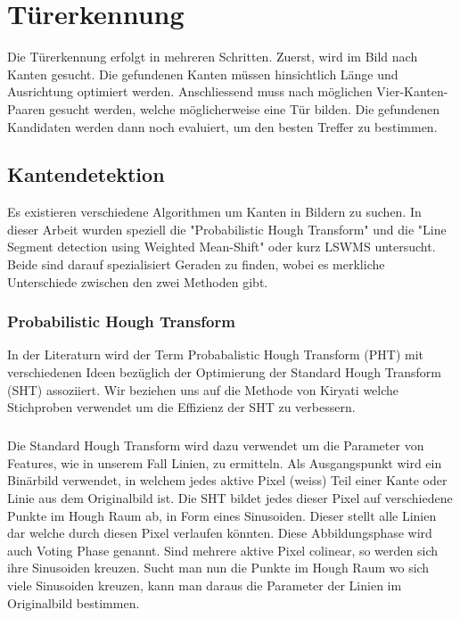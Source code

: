\chapter{Türerkennung}

Die Türerkennung erfolgt in mehreren Schritten. Zuerst, wird im Bild nach Kanten gesucht. Die gefundenen Kanten müssen hinsichtlich Länge und Ausrichtung optimiert werden. Anschliessend muss nach möglichen Vier-Kanten-Paaren gesucht werden, welche möglicherweise eine Tür bilden. Die gefundenen Kandidaten werden dann noch evaluiert, um den besten Treffer zu bestimmen.

\section{Kantendetektion}

Es existieren verschiedene Algorithmen um Kanten in Bildern zu suchen. In dieser Arbeit wurden speziell die "Probabilistic Hough Transform" und die "Line Segment detection using Weighted Mean-Shift" oder kurz LSWMS untersucht. Beide sind darauf spezialisiert Geraden zu finden, wobei es merkliche Unterschiede zwischen den zwei Methoden gibt.

\subsection{Probabilistic Hough Transform}

In der Literaturn wird der Term Probabalistic Hough Transform (PHT) mit verschiedenen Ideen bezüglich der Optimierung der Standard Hough Transform (SHT) assoziiert. Wir beziehen uns auf die Methode von Kiryati \cite{kiryati} welche Stichproben verwendet um die Effizienz der SHT zu verbessern.
\paragraph{}
Die Standard Hough Transform wird dazu verwendet um die Parameter von Features, wie in unserem Fall Linien, zu ermitteln. Als Ausgangspunkt wird ein Binärbild verwendet, in welchem jedes aktive Pixel (weiss) Teil einer Kante oder Linie aus dem Originalbild ist. Die SHT bildet jedes dieser Pixel auf verschiedene Punkte im Hough Raum ab, in Form eines Sinusoiden. Dieser stellt alle Linien dar welche durch diesen Pixel verlaufen könnten. Diese Abbildungsphase wird auch Voting Phase genannt. Sind mehrere aktive Pixel colinear, so werden sich ihre Sinusoiden kreuzen. Sucht man nun die Punkte im Hough Raum wo sich viele Sinusoiden kreuzen, kann man daraus die Parameter der Linien im Originalbild bestimmen.
